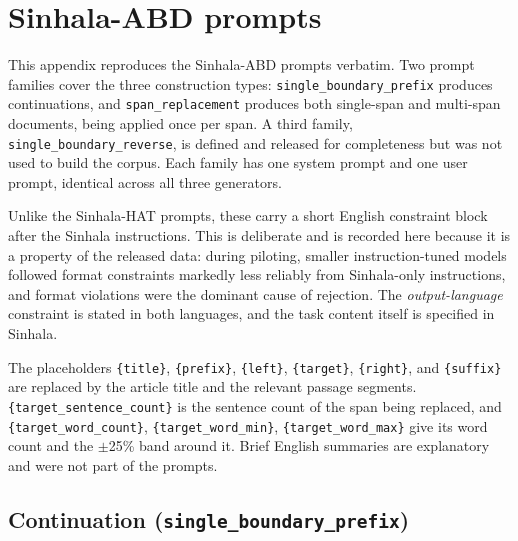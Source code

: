 
\section{Sinhala-ABD prompts}
\label{app:abd-prompts}

This appendix reproduces the Sinhala-ABD prompts verbatim. Two prompt families
cover the three construction types: \texttt{single\_boundary\_prefix} produces
continuations, and \texttt{span\_replacement} produces both single-span and
multi-span documents, being applied once per span. A third family,
\texttt{single\_boundary\_reverse}, is defined and released for completeness but
was not used to build the corpus. Each family has one system prompt and one user
prompt, identical across all three generators.

Unlike the Sinhala-HAT prompts, these carry a short English constraint block
after the Sinhala instructions. This is deliberate and is recorded here because
it is a property of the released data: during piloting, smaller instruction-tuned
models followed format constraints markedly less reliably from Sinhala-only
instructions, and format violations were the dominant cause of rejection. The
\emph{output-language} constraint is stated in both languages, and the
task content itself is specified in Sinhala.

The placeholders \texttt{\{title\}}, \texttt{\{prefix\}}, \texttt{\{left\}},
\texttt{\{target\}}, \texttt{\{right\}}, and \texttt{\{suffix\}} are replaced by
the article title and the relevant passage segments.
\texttt{\{target\_sentence\_count\}} is the sentence count of the span being
replaced, and \texttt{\{target\_word\_count\}},
\texttt{\{target\_word\_min\}}, \texttt{\{target\_word\_max\}} give its word
count and the $\pm$25\% band around it. Brief English summaries are explanatory
and were not part of the prompts.

\subsection*{Continuation (\texttt{single\_boundary\_prefix})}

